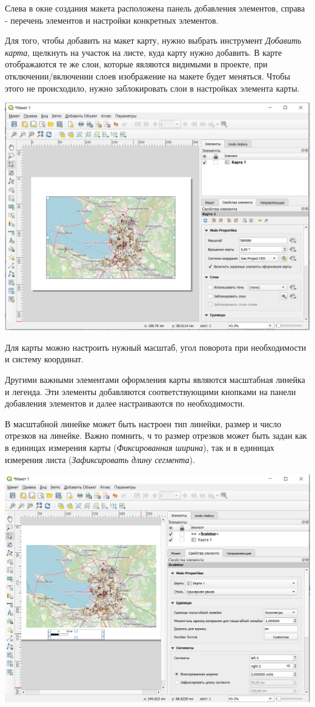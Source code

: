 \documentclass[
]{book}
\begin{document}
Слева в окне создания макета расположена панель добавления элементов, справа - перечень элементов и настройки конкретных элементов.

Для того, чтобы добавить на макет карту, нужно выбрать инструмент \emph{Добавить карта}, щелкнуть на участок на листе, куда карту нужно добавить. В карте отображаются те же слои, которые являются видимыми в проекте, при отключении/включении слоев изображение на макете будет меняться. Чтобы этого не происходило, нужно заблокировать слои в настройках элемента карты.

\includegraphics{figures/28.PNG}

Для карты можно настроить нужный масштаб, угол поворота при необходимости и систему координат.

Другими важными элементами оформления карты являются масштабная линейка и легенда. Эти элементы добавляются соответствующими кнопками на панели добавления элементов и далее настраиваются по необходимости.

В масштабной линейке может быть настроен тип линейки, размер и число отрезков на линейке. Важно помнить, ч то размер отрезков может быть задан как в единицах измерения карты (\emph{Фиксированная ширина}), так и в единицах измерения листа (\emph{Зафиксировать длину сегмента}).

\includegraphics{figures/29.PNG}
\end{document}
